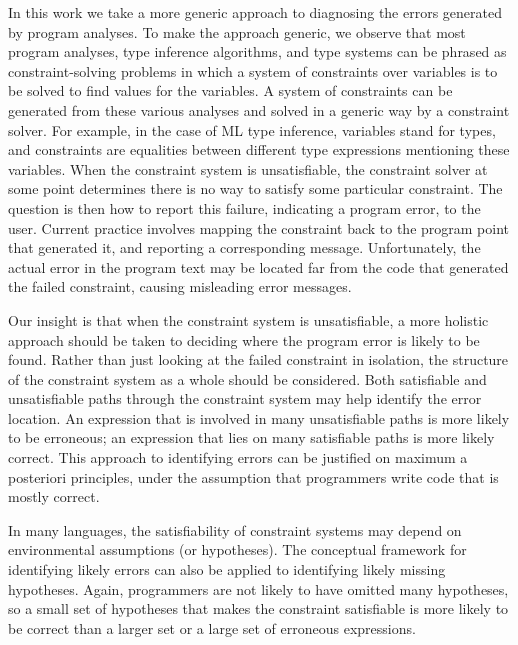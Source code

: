 In this work we take a more generic approach to diagnosing the errors
generated by program analyses.  To make the approach generic, we
observe that most program analyses, type inference algorithms, and
type systems can be phrased as constraint-solving problems in which a
system of constraints over variables is to be solved to find values
for the variables.  A system of constraints can be generated from
these various analyses and solved in a generic way by a constraint
solver. For example, in the case of ML type inference, variables
stand for types, and constraints are equalities between different
type expressions mentioning these variables. When the constraint
system is unsatisfiable, the constraint solver at some point
determines there is no way to satisfy some particular constraint. The
question is then how to report this failure, indicating a program
error, to the user. Current practice involves mapping the constraint
back to the program point that generated it, and reporting a
corresponding message. Unfortunately, the actual error in the program
text may be located far from the code that generated the failed
constraint, causing misleading error messages.

Our insight is that when the constraint system is unsatisfiable, a
more holistic approach should be taken to deciding where the program
error is likely to be found. Rather than just looking at the failed
constraint in isolation, the structure of the constraint system as
a whole should be considered. Both satisfiable and unsatisfiable
paths through the constraint system may help identify
the error location.  An expression that is involved
in many unsatisfiable paths is more likely to be erroneous;
an expression that lies on many satisfiable paths is more likely
correct. This approach to identifying errors can be
justified on maximum a posteriori principles, under the assumption
that programmers write code that is mostly correct.

In many languages, the satisfiability of constraint systems may depend
on environmental assumptions (or hypotheses). The conceptual framework
for identifying likely errors can also be applied to identifying likely
missing hypotheses. Again, programmers are not likely to have omitted
many hypotheses, so a small set of hypotheses that makes the constraint
satisfiable is more likely to be correct than a larger set or a large
set of erroneous expressions.

